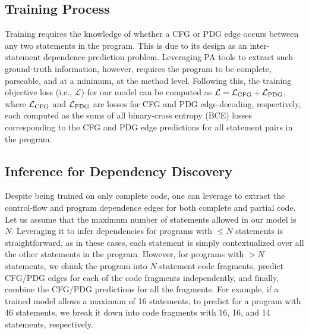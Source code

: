 \subsection{\bf Training Process}
Training \tool requires the knowledge of whether a CFG or PDG edge occurs between any two statements in the program. This is due to its design as an inter-statement dependence prediction problem. Leveraging PA tools to extract such ground-truth information, however, requires the program to be complete, parseable, and at a minimum, at the method level. Following this, the training objective loss (i.e., $\mathcal{L}$) for our model can be computed as ${\mathcal{L} = \mathcal{L}\textsubscript{CFG} + \mathcal{L}\textsubscript{PDG}}$,
where $\mathcal{L}\textsubscript{CFG}$ and $\mathcal{L}\textsubscript{PDG}$ are losses for CFG and PDG edge-decoding, respectively, each computed as the sums of all binary-cross entropy (BCE) losses corresponding to the CFG and PDG edge predictions for all statement pairs in the program.


\subsection{\bf Inference for Dependency Discovery}
\label{sec:inference}
Despite being trained on only complete code, one can leverage \tool to extract the control-flow and program dependence edges for both complete and partial code. Let us assume that the maximum number of statements allowed in our model is $N$. Leveraging it to infer dependencies for programs with ${\leq}N$ statements is straightforward, as in these cases, each statement is simply contextualized over all the other statements in the program. However, for programs with ${>}N$ statements,
we 
chunk the program into $N$-statement code fragments, predict CFG/PDG edges for each of the code fragments independently, and finally, combine the CFG/PDG predictions for all the fragments. For example, if a trained model allows a maximum of 16 statements, to predict for a program with 46 statements, we break it down into code fragments with 16, 16, and 14 statements, respectively.
